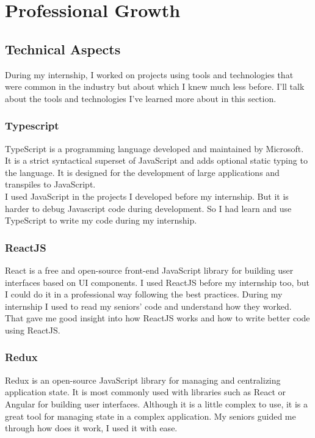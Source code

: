 \chapter{Professional Growth}

\section{Technical Aspects}

During my internship, I worked on projects using tools and technologies that were common in the industry but about which I knew much less before.
I'll talk about the tools and technologies I've learned more about in this section.

\subsection{Typescript}

TypeScript is a programming language developed and maintained by Microsoft.
It is a strict syntactical superset of JavaScript and adds optional static typing to the language.
It is designed for the development of large applications and transpiles to JavaScript.\\

I used JavaScript in the projects I developed before my internship.
But it is harder to debug Javascript code during development.
So I had learn and use TypeScript to write my code during my internship.

\subsection{ReactJS}

React is a free and open-source front-end JavaScript library for building user interfaces based on UI components.
I used ReactJS before my internship too, but I could do it in a professional way following the best practices.
During my internship I used to read my seniors' code and understand how they worked.
That gave me good insight into how ReactJS works and how to write better code using ReactJS.

\subsection{Redux}

Redux is an open-source JavaScript library for managing and centralizing application state.
It is most commonly used with libraries such as React or Angular for building user interfaces.
Although it is a little complex to use, it is a great tool for managing state in a complex application.
My seniors guided me through how does it work, I used it with ease.


